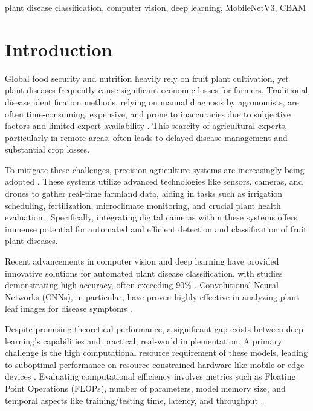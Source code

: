 \documentclass[preprint,12pt]{elsarticle}
\begin{document}
\begin{frontmatter}
\begin{keyword}
plant disease classification, computer vision, deep learning, MobileNetV3, CBAM


\end{keyword}

\end{frontmatter}


\section{Introduction}
\label{sec1}

Global food security and nutrition heavily rely on fruit plant cultivation, yet plant diseases frequently cause significant economic losses for farmers. Traditional disease identification methods, relying on manual diagnosis by agronomists, are often time-consuming, expensive, and prone to inaccuracies due to subjective factors and limited expert availability \cite{Sajitha2024, Wang2024}. This scarcity of agricultural experts, particularly in remote areas, often leads to delayed disease management and substantial crop losses.

To mitigate these challenges, precision agriculture systems are increasingly being adopted \cite{Laveglia2024}. These systems utilize advanced technologies like sensors, cameras, and drones to gather real-time farmland data, aiding in tasks such as irrigation scheduling, fertilization, microclimate monitoring, and crucial plant health evaluation \cite{Balafas2023}. Specifically, integrating digital cameras within these systems offers immense potential for automated and efficient detection and classification of fruit plant diseases.

Recent advancements in computer vision and deep learning have provided innovative solutions for automated plant disease classification, with studies demonstrating high accuracy, often exceeding 90\% \cite{Lu2025,Sajitha2024, Pandian2022, Syed-Ab-Rahman2022}. Convolutional Neural Networks (CNNs), in particular, have proven highly effective in analyzing plant leaf images for disease symptoms \cite{Vishnoi2023}.

Despite promising theoretical performance, a significant gap exists between deep learning's capabilities and practical, real-world implementation. A primary challenge is the high computational resource requirement of these models, leading to suboptimal performance on resource-constrained hardware like mobile or edge devices \cite{Liu2023}. Evaluating computational efficiency involves metrics such as Floating Point Operations (FLOPs), number of parameters, model memory size, and temporal aspects like training/testing time, latency, and throughput \cite{Menghani2023,Qi2022}.
\end{document}
